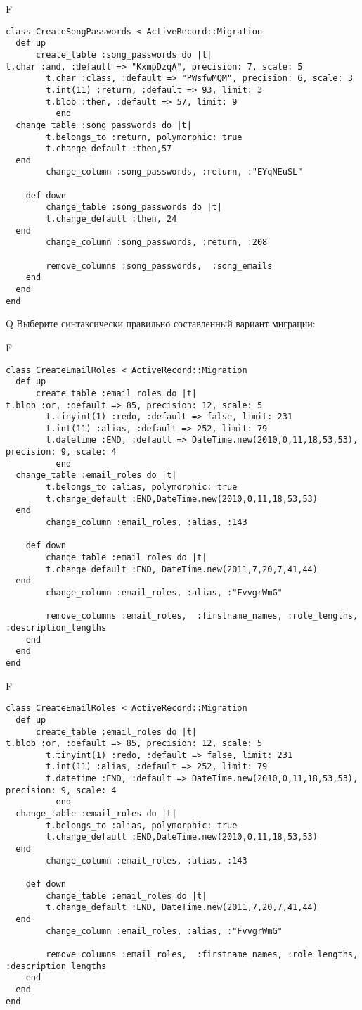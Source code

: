 F
\begin{verbatim}
class CreateSongPasswords < ActiveRecord::Migration
  def up
	  create_table :song_passwords do |t|
t.char :and, :default => "KxmpDzqA", precision: 7, scale: 5
		t.char :class, :default => "PWsfwMQM", precision: 6, scale: 3
		t.int(11) :return, :default => 93, limit: 3
		t.blob :then, :default => 57, limit: 9
		  end
  change_table :song_passwords do |t|
		t.belongs_to :return, polymorphic: true
 		t.change_default :then,57
  end
 		change_column :song_passwords, :return, :"EYqNEuSL"
   
	def down
		change_table :song_passwords do |t|
		t.change_default :then, 24
  end
 		change_column :song_passwords, :return, :208
   
		remove_columns :song_passwords,  :song_emails 
    end 
  end
end

\end{verbatim}

Q
Выберите синтаксически правильно составленный вариант миграции:

F
\begin{verbatim}
class CreateEmailRoles < ActiveRecord::Migration
  def up
	  create_table :email_roles do |t|
t.blob :or, :default => 85, precision: 12, scale: 5
		t.tinyint(1) :redo, :default => false, limit: 231
		t.int(11) :alias, :default => 252, limit: 79
		t.datetime :END, :default => DateTime.new(2010,0,11,18,53,53), precision: 9, scale: 4
		  end
  change_table :email_roles do |t|
		t.belongs_to :alias, polymorphic: true
 		t.change_default :END,DateTime.new(2010,0,11,18,53,53)
  end
 		change_column :email_roles, :alias, :143
   
	def down
		change_table :email_roles do |t|
		t.change_default :END, DateTime.new(2011,7,20,7,41,44)
  end
 		change_column :email_roles, :alias, :"FvvgrWmG"
   
		remove_columns :email_roles,  :firstname_names, :role_lengths, :description_lengths 
    end 
  end
end

\end{verbatim}

F
\begin{verbatim}
class CreateEmailRoles < ActiveRecord::Migration
  def up
	  create_table :email_roles do |t|
t.blob :or, :default => 85, precision: 12, scale: 5
		t.tinyint(1) :redo, :default => false, limit: 231
		t.int(11) :alias, :default => 252, limit: 79
		t.datetime :END, :default => DateTime.new(2010,0,11,18,53,53), precision: 9, scale: 4
		  end
  change_table :email_roles do |t|
		t.belongs_to :alias, polymorphic: true
 		t.change_default :END,DateTime.new(2010,0,11,18,53,53)
  end
 		change_column :email_roles, :alias, :143
   
	def down
		change_table :email_roles do |t|
		t.change_default :END, DateTime.new(2011,7,20,7,41,44)
  end
 		change_column :email_roles, :alias, :"FvvgrWmG"
   
		remove_columns :email_roles,  :firstname_names, :role_lengths, :description_lengths 
    end 
  end
end

\end{verbatim}


